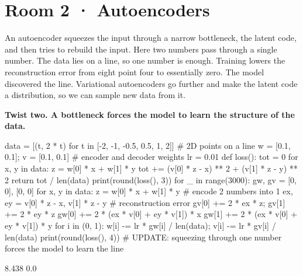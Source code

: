 \documentclass[11pt,a4paper]{report}
\begin{document}
\section*{Room 2 · Autoencoders}
An autoencoder squeezes the input through a narrow bottleneck, the latent code, and then tries to rebuild the input. Here two numbers pass through a single number. The data lies on a line, so one number is enough. Training lowers the reconstruction error from eight point four to essentially zero. The model discovered the line. Variational autoencoders go further and make the latent code a distribution, so we can sample new data from it.
\begin{tcolorbox}[colback=yellow!12,colframe=orange!70!black,boxrule=0.4pt,left=4pt,right=4pt,top=2pt,bottom=2pt]\textbf{Twist two. A bottleneck forces the model to learn the structure of the data.}\end{tcolorbox}
\begin{Code}
data = [(t, 2 * t) for t in [-2, -1, -0.5, 0.5, 1, 2]]    # 2D points on a line
w = [0.1, 0.1]; v = [0.1, 0.1]              # encoder and decoder weights
lr = 0.01
def loss():
    tot = 0
    for x, y in data:
        z = w[0] * x + w[1] * y
        tot += (v[0] * z - x) ** 2 + (v[1] * z - y) ** 2
    return tot / len(data)
print(round(loss(), 3))
for _ in range(3000):
    gw, gv = [0, 0], [0, 0]
    for x, y in data:
        z = w[0] * x + w[1] * y             # encode 2 numbers into 1
        ex, ey = v[0] * z - x, v[1] * z - y # reconstruction error
        gv[0] += 2 * ex * z; gv[1] += 2 * ey * z
        gw[0] += 2 * (ex * v[0] + ey * v[1]) * x
        gw[1] += 2 * (ex * v[0] + ey * v[1]) * y
    for i in (0, 1): w[i] -= lr * gw[i] / len(data); v[i] -= lr * gv[i] / len(data)
print(round(loss(), 4))
# UPDATE: squeezing through one number forces the model to learn the line
\end{Code}
\begin{Out}
8.438
0.0
\end{Out}
\end{document}
